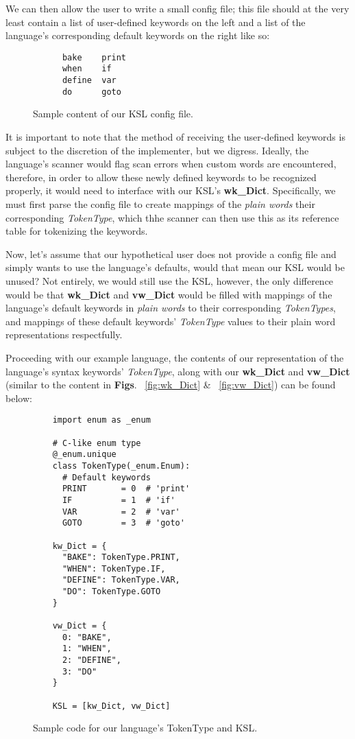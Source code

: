 \documentclass[a4paper,9pt]{article}
\begin{document}
We can then allow the user to write a small config file; this file should at the very least contain a list of user-defined keywords on the left and a list of the language's corresponding default keywords on the right like so:

\begin{figure}[ht]
  \begin{verbatim}
      bake    print
      when    if
      define  var
      do      goto
  \end{verbatim}
  \caption{Sample content of our KSL config file.}
  \label{fig:ksl-config-file}
\end{figure}

It is important to note that the method of receiving the user-defined keywords is subject to the discretion of the implementer, but we digress. Ideally, the language's scanner would flag scan errors when custom words are encountered, therefore, in order to allow these newly defined keywords to be recognized properly, it would need to interface with our KSL's \textbf{wk\_Dict}. Specifically, we must first parse the config file to create mappings of the \textit{plain words} their corresponding \textit{TokenType}, which thhe scanner can then use this as its reference table for tokenizing the keywords.

Now, let's assume that our hypothetical user does not provide a config file and simply wants to use the language's defaults, would that mean our KSL would be unused? Not entirely, we would still use the KSL, however, the only difference would be that \textbf{wk\_Dict} and \textbf{vw\_Dict} would be filled with mappings of the language's default keywords in \textit{plain words} to their corresponding \textit{TokenTypes}, and mappings of these default keywords' \textit{TokenType} values to their plain word representations respectfully.

Proceeding with our example language, the contents of our representation of the language's syntax keywords' \textit{TokenType}, along with our \textbf{wk\_Dict} and \textbf{vw\_Dict} (similar to the content in \textbf{Figs}. ~\ref{fig:wk_Dict} \& ~\ref{fig:vw_Dict}) can be found below: 

\begin{figure}[ht]
  \begin{verbatim}
    import enum as _enum 

    # C-like enum type
    @_enum.unique
    class TokenType(_enum.Enum):
      # Default keywords
      PRINT       = 0  # 'print'
      IF          = 1  # 'if'
      VAR         = 2  # 'var'
      GOTO        = 3  # 'goto'
    
    kw_Dict = {
      "BAKE": TokenType.PRINT,
      "WHEN": TokenType.IF,
      "DEFINE": TokenType.VAR,
      "DO": TokenType.GOTO
    }

    vw_Dict = {
      0: "BAKE",
      1: "WHEN",
      2: "DEFINE",
      3: "DO"
    }

    KSL = [kw_Dict, vw_Dict]
  \end{verbatim}
  \caption{Sample code for our language's TokenType and KSL.}
  \label{fig:sample-code0}
\end{figure}
\end{document}
